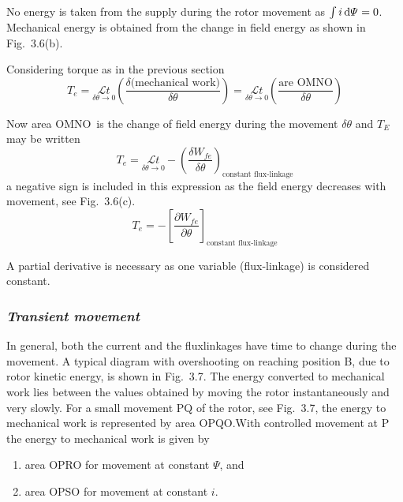 \documentclass[a4paper,numbers=noenddot,12pt]{scrbook}
\begin{document}
            No energy is taken from the supply during the rotor movement as $\int i \dif \varPsi = 0$. Mechanical energy is obtained from the change in field energy as shown in Fig.\ 3.6(b).

            Considering torque as in the previous section 
            \begin{equation}
                T_e = \underset{\delta \theta \to 0}{\mathcal{L} t} \left(\dfrac{\delta \text{(mechanical work)}}{\delta \theta}\right) = \underset{\delta \theta \to 0}{\mathcal{L} t} \left(\dfrac{\text{are OMNO}}{\delta \theta}\right)
                \label{eq:Eq3.21}
            \end{equation}

            Now area OMNO\ is the change of field energy during the movement $\delta \theta$ and $T_E$ may be written 
            \begin{equation}
                T_e = \underset{\delta \theta \to 0}{\mathcal{L} t} - {\left( \dfrac{\delta W_{fe}}{\delta \theta}\right)}_{\text{constant flux-linkage}}
                \label{eq:Ee3.22}
            \end{equation}
            a negative sign is included in this expression as the field energy decreases with movement, see Fig.\ 3.6(c). 
            \begin{equation}
                T_e = - {\left[ \dfrac{\partial W_{fe}}{\partial \theta}\right]}_{\text{constant flux-linkage}}
                \label{eq_Eq3.23}
            \end{equation}

            A partial derivative is necessary as one variable (flux-linkage) is considered constant. 
            \subsubsection{\textit{Transient movement}}
            In general, both the current and the flux­linkages have time to change during the movement. A typical diagram with overshooting on reaching position B, due to rotor kinetic energy, is shown in Fig.\ 3.7. The energy converted to mechanical work lies between the values obtained by moving the rotor instantaneously and very slowly. 
            For a small movement PQ of the rotor, see Fig.\ 3.7, the energy to mechanical work is represented by area OPQO.\@ With controlled movement at P the energy to mechanical work is given by
            \begin{enumerate}[label={}]
                \item area OPRO for movement at constant $\varPsi$, and
                \item area OPSO for movement at constant $i$.
            \end{enumerate}
\end{document}
